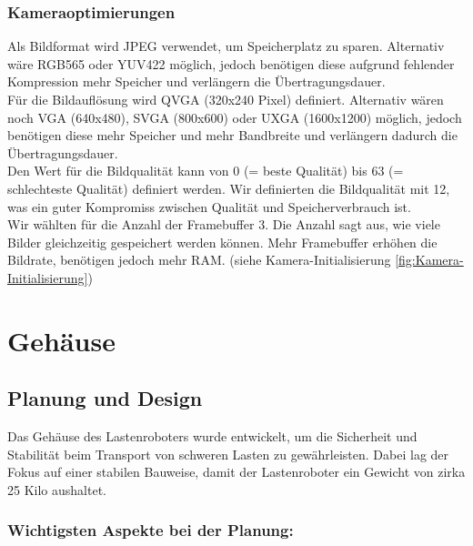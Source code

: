 \documentclass[ngerman,12pt,a4paper]{article}
\begin{document}
							\subsubsection*{Kameraoptimierungen}
	Als Bildformat wird JPEG verwendet, um Speicherplatz zu sparen. Alternativ wäre RGB565 oder YUV422 möglich, jedoch benötigen diese aufgrund fehlender Kompression mehr Speicher und verlängern die Übertragungsdauer. \\[0.5cm]
	Für die Bildauflösung wird QVGA (320x240 Pixel) definiert. Alternativ wären noch VGA (640x480), SVGA (800x600) oder UXGA (1600x1200) möglich, jedoch benötigen diese mehr Speicher und mehr Bandbreite und verlängern dadurch die Übertragungsdauer.\\[0.5cm]
	Den Wert für die Bildqualität kann von 0 (= beste Qualität) bis 63 (= schlechteste Qualität) definiert werden. Wir definierten die Bildqualität mit 12, was ein guter Kompromiss zwischen Qualität und Speicherverbrauch ist.\\[0.5cm]
	Wir wählten für die Anzahl der Framebuffer 3. Die Anzahl sagt aus, wie viele Bilder gleichzeitig gespeichert werden können. Mehr Framebuffer erhöhen die Bildrate, benötigen jedoch mehr RAM. (siehe Kamera-Initialisierung \ref{fig:Kamera-Initialisierung})\\[0.5cm]
					
	\newpage
	\section{Gehäuse}
	
		\subsection{Planung und Design} %
		
		Das Gehäuse des Lastenroboters wurde entwickelt, um die Sicherheit und Stabilität beim Transport von schweren Lasten zu gewährleisten. Dabei lag der Fokus auf einer stabilen Bauweise, damit der Lastenroboter ein Gewicht von zirka 25 Kilo aushaltet. 
		
			\subsubsection*{Wichtigsten Aspekte bei der Planung: }
		
\end{document}
